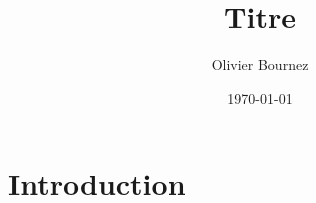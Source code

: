 \documentclass{article}
\begin{document}
\title{Titre}
\author{
 Olivier Bournez%
\\[0.5cm] %
}
\date{\today}

\maketitle

\begin{abstract}
\end{abstract}


\section{Introduction}




\end{document}
